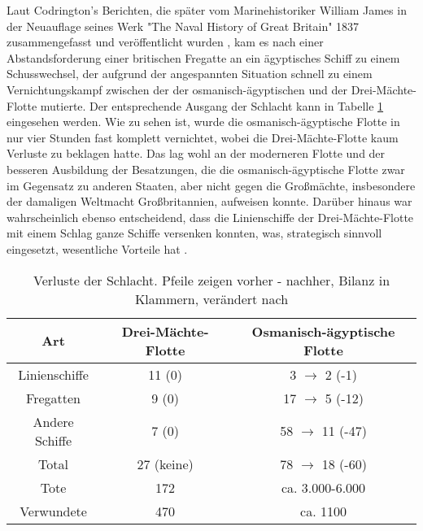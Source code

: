 \documentclass[preprint]{geomorphica} %
\begin{document}
Laut Codrington's Berichten, die später vom Marinehistoriker William James in der Neuauflage seines Werk "The Naval History of Great Britain" 1837 zusammengefasst und veröffentlicht wurden \cite{James1837}, kam es nach einer Abstandsforderung einer britischen Fregatte an ein ägyptisches Schiff zu einem Schusswechsel, der aufgrund der angespannten Situation schnell zu einem Vernichtungskampf zwischen der der osmanisch-ägyptischen und der Drei-Mächte-Flotte mutierte.
Der entsprechende Ausgang der Schlacht kann in Tabelle \ref{tab:schlachtverluste} eingesehen werden.
Wie zu sehen ist, wurde die osmanisch-ägyptische Flotte in nur vier Stunden fast komplett vernichtet, wobei die Drei-Mächte-Flotte kaum Verluste zu beklagen hatte.
Das lag wohl an der moderneren Flotte und der besseren Ausbildung der Besatzungen, die die osmanisch-ägyptische Flotte zwar im Gegensatz zu anderen Staaten, aber nicht gegen die Großmächte, insbesondere der damaligen Weltmacht Großbritannien, aufweisen konnte.
Darüber hinaus war wahrscheinlich ebenso entscheidend, dass die Linienschiffe der Drei-Mächte-Flotte mit einem Schlag ganze Schiffe versenken konnten, was, strategisch sinnvoll eingesetzt, wesentliche Vorteile hat \cite{James1837, Dakin1973, Woodhouse1965}.

\begin{table}[h]
    \caption{Verluste der Schlacht. Pfeile zeigen vorher - nachher, Bilanz in Klammern, verändert nach \cite{James1837}}
    \begin{center}
        \begin{tabular}{c c c}
            \hline
            Art & Drei-Mächte-Flotte & Osmanisch-ägyptische Flotte \\
            \hline
            Linienschiffe & 11 (0) & 3 $\rightarrow$ 2 (-1) \\
            Fregatten & 9 (0) & 17 $\rightarrow$ 5 (-12) \\
            Andere Schiffe & 7 (0) & 58 $\rightarrow$ 11 (-47) \\
            \hline
            Total & 27 (keine) & 78 $\rightarrow$ 18 (-60) \\
            \hline
            Tote  & 172 & ca. 3.000-6.000 \\
            Verwundete & 470 & ca. 1100 \\
            \hline
        \end{tabular}
    \end{center}
    \label{tab:schlachtverluste}
\end{table}
\end{document}
